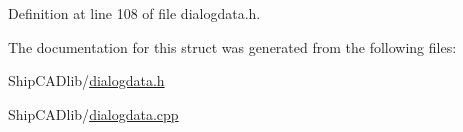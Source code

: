 Definition at line 108 of file dialogdata.\+h.



The documentation for this struct was generated from the following files\+:\begin{DoxyCompactItemize}
\item 
Ship\+C\+A\+Dlib/\hyperlink{dialogdata_8h}{dialogdata.\+h}\item 
Ship\+C\+A\+Dlib/\hyperlink{dialogdata_8cpp}{dialogdata.\+cpp}\end{DoxyCompactItemize}
